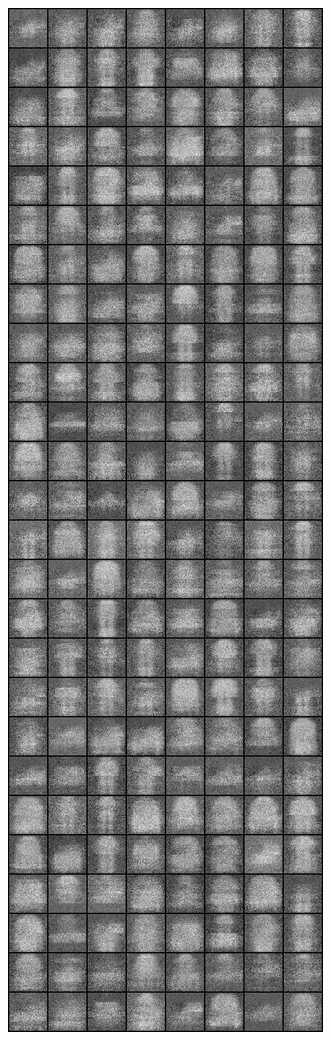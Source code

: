 \begin{figure}
\includegraphics[width=\picwidth\columnwidth]{figures/supplementary/alternative_fmnist/image_250.png}

\end{figure}
